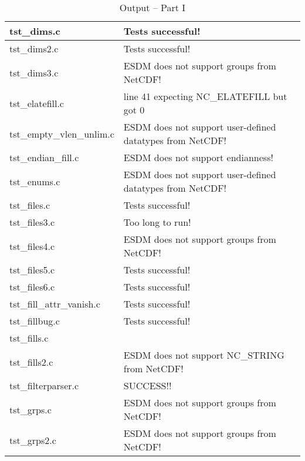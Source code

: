 \begin{table}[H]
\begin{tabular}{|l|l|}
tst\_dims.c   &  Tests successful!      \\ \hline
tst\_dims2.c   & Tests successful!       \\ \hline
tst\_dims3.c   & ESDM does not support groups from NetCDF!      \\ \hline
tst\_elatefill.c   & line 41 expecting NC\_ELATEFILL but got 0   \\ \hline
tst\_empty\_vlen\_unlim.c   &  ESDM does not support user-defined datatypes from NetCDF!    \\ \hline
tst\_endian\_fill.c   &    ESDM does not support endianness! \\ \hline
tst\_enums.c   &   ESDM does not support user-defined datatypes from NetCDF!   \\ \hline
tst\_files.c   &  Tests successful!     \\ \hline
tst\_files3.c   &  Too long to run!  \\ \hline
tst\_files4.c   &   ESDM does not support groups from NetCDF!    \\ \hline
tst\_files5.c   & Tests successful!  \\ \hline
tst\_files6.c   &  Tests successful!    \\ \hline
tst\_fill\_attr\_vanish.c   &  Tests successful! \\ \hline
tst\_fillbug.c   & Tests successful!      \\ \hline
tst\_fills.c   &       \\ \hline
tst\_fills2.c   &   ESDM does not support NC\_STRING from NetCDF!   \\ \hline
tst\_filterparser.c   & SUCCESS!!   \\ \hline
tst\_grps.c   &    ESDM does not support groups from NetCDF!   \\ \hline
tst\_grps2.c   &   ESDM does not support groups from NetCDF!    \\ \hline
\hline
\end{tabular}
\caption{Output -- Part I}
\end{table}

\clearpage

